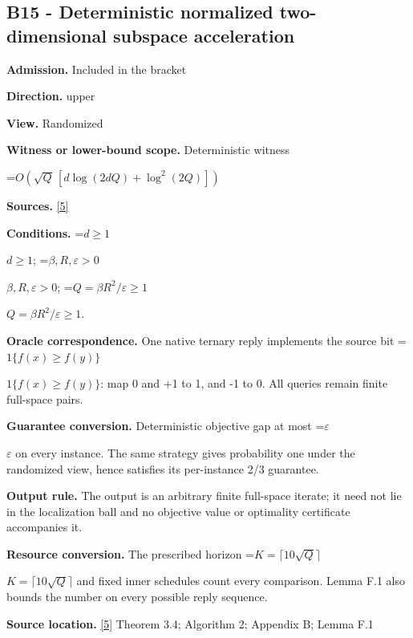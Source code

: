 \documentclass[10pt,a4paper]{article}
\newcommand{\AtlasMath}[1]{\par\begingroup\centering\setbox0=\hbox{$\displaystyle #1$}\ifdim\wd0>1.4\linewidth\typeout{ATLAS WIDE FORMULA: \the\wd0}\fi\ifdim\wd0>\linewidth\resizebox{\linewidth}{!}{\box0}\else\box0\fi\par\endgroup}
\newcommand{\AtlasInlineMath}[1]{\begingroup\setbox0=\hbox{$#1$}\ifdim\wd0>.4\linewidth\endgroup\AtlasMath{#1}\else\endgroup$#1$\fi}
\begin{document}
\subsection{B15 - Deterministic normalized two-dimensional subspace acceleration}


\textbf{Admission.} Included in the bracket



\textbf{Direction.} upper



\textbf{View.} Randomized



\textbf{Witness or lower-bound scope.} Deterministic witness



\AtlasMath{O\!\left(\sqrt Q\,[d\log(2dQ)+\log^2(2Q)]\right)}


\textbf{Sources.} \href{https://arxiv.org/html/2611.29533v1}{[5]}



\textbf{Conditions.} \AtlasInlineMath{d\ge1}; \AtlasInlineMath{\beta,R,\varepsilon>0}; \AtlasInlineMath{Q=\beta R^2/\varepsilon\ge1}.



\textbf{Oracle correspondence.} One native ternary reply implements the source bit \AtlasInlineMath{1\{f(x)\ge f(y)\}}: map 0 and +1 to 1, and -1 to 0. All queries remain finite full-space pairs.



\textbf{Guarantee conversion.} Deterministic objective gap at most \AtlasInlineMath{\varepsilon} on every instance. The same strategy gives probability one under the randomized view, hence satisfies its per-instance 2/3 guarantee.



\textbf{Output rule.} The output is an arbitrary finite full-space iterate; it need not lie in the localization ball and no objective value or optimality certificate accompanies it.



\textbf{Resource conversion.} The prescribed horizon \AtlasInlineMath{K=\lceil10\sqrt Q\rceil} and fixed inner schedules count every comparison. Lemma F.1 also bounds the number on every possible reply sequence.



\textbf{Source location.} \href{https://arxiv.org/html/2611.29533v1}{[5]} Theorem 3.4; Algorithm 2; Appendix B; Lemma F.1
\end{document}
